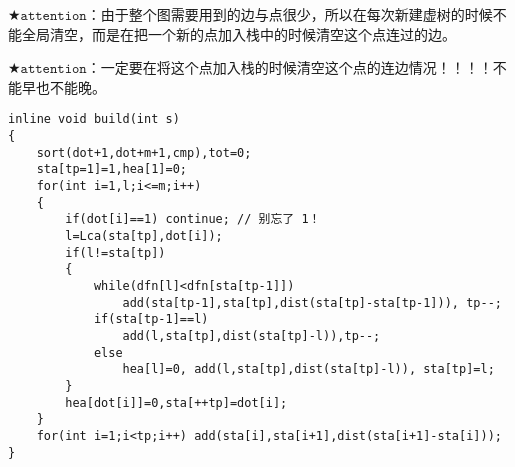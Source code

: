 $\bigstar\texttt{attention}$：由于整个图需要用到的边与点很少，所以在每次新建虚树的时候不能全局清空，而是在把一个新的点加入栈中的时候清空这个点连过的边。

$\bigstar\texttt{attention}$：一定要在将这个点加入栈的时候清空这个点的连边情况！！！！不能早也不能晚。

\begin{verbatim}
inline void build(int s)
{
    sort(dot+1,dot+m+1,cmp),tot=0;
    sta[tp=1]=1,hea[1]=0;
    for(int i=1,l;i<=m;i++)
    {
        if(dot[i]==1) continue; // 别忘了 1！ 
        l=Lca(sta[tp],dot[i]);
        if(l!=sta[tp])
        {
            while(dfn[l]<dfn[sta[tp-1]])
                add(sta[tp-1],sta[tp],dist(sta[tp]-sta[tp-1])), tp--;
            if(sta[tp-1]==l)
                add(l,sta[tp],dist(sta[tp]-l)),tp--;
            else
                hea[l]=0, add(l,sta[tp],dist(sta[tp]-l)), sta[tp]=l;
        }
        hea[dot[i]]=0,sta[++tp]=dot[i];
    }
    for(int i=1;i<tp;i++) add(sta[i],sta[i+1],dist(sta[i+1]-sta[i]));
}
\end{verbatim}